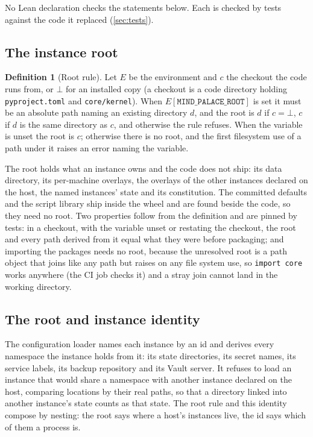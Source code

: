 \documentclass[11pt]{article}
\theoremstyle{plain}
\theoremstyle{definition}
\newtheorem{definition}[theorem]{Definition}
\theoremstyle{remark}
\newcommand{\envroot}{\texttt{MIND\_PALACE\_ROOT}}
\begin{document}
No Lean declaration checks the statements below. Each is checked by tests against the code it
replaced (\cref{sec:tests}).

\subsection{The instance root}\label{sec:root}

\begin{definition}[Root rule]
Let $E$ be the environment and $c$ the checkout the code runs from, or $\bot$ for an installed copy
(a checkout is a code directory holding \texttt{pyproject.toml} and \texttt{core/kernel}). When
$E[\envroot]$ is set it must be an absolute path naming an existing directory $d$, and the root is
$d$ if $c = \bot$, $c$ if $d$ is the same directory as $c$, and otherwise the rule refuses. When the
variable is unset the root is $c$; otherwise there is no root, and the first filesystem use of a
path under it raises an error naming the variable.
\end{definition}

The root holds what an instance owns and the code does not ship: its data directory, its
per-machine overlays, the overlays of the other instances declared on the host, the named
instances' state and its constitution. The committed defaults and the script library ship
inside the wheel and are found beside the code, so they need no root. Two properties follow from the
definition and are pinned by tests: in a checkout, with the variable unset or restating the
checkout, the root and every path derived from it equal what they were before packaging; and
importing the packages needs no root,
because the unresolved root is a path object that joins like any path but raises on any file system
use, so \texttt{import core} works anywhere (the CI job checks it) and a stray join cannot land in
the working directory.

\subsection{The root and instance identity}\label{sec:compose}

The configuration loader names each instance by an id and derives every namespace the instance
holds from it: its state directories, its secret names, its service labels, its backup repository
and its Vault server. It refuses to load an instance that would share a namespace with another
instance declared on the host, comparing locations by their real paths, so that a directory linked
into another instance's state counts as that state. The root rule and this identity compose by
nesting: the root says where a host's instances live, the id says which of them a process is.
\end{document}
